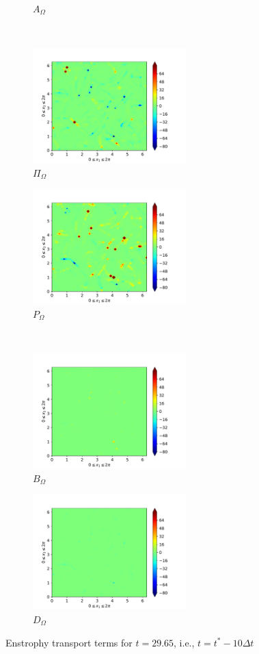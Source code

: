 \begin{figure}[H]
\begin{subfigure}{0.45\textwidth}
        \caption{$A_{\Omega}$}
    \end{subfigure}
    ~
    \begin{subfigure}{0.45\textwidth}
        \includegraphics[height=1.75in]{media/run-cds-65/Pi-enst-1330}
        \caption{$\Pi_{\Omega}$}
    \end{subfigure}
    \newline
    \begin{subfigure}{0.45\textwidth}
        \includegraphics[height=1.75in]{media/run-cds-65/P-enst-1330}
        \caption{$P_{\Omega}$}
    \end{subfigure}
    ~
    \begin{subfigure}{0.45\textwidth}
        \includegraphics[height=1.75in]{media/run-cds-65/B-enst-1330}
        \caption{$B_{\Omega}$}
    \end{subfigure}
    \newline
    \begin{subfigure}{0.45\textwidth}
        \includegraphics[height=1.75in]{media/run-cds-65/D-enst-1330}
        \caption{$D_{\Omega}$}
    \end{subfigure}
    \caption{Enstrophy transport terms for $t=29.65$, i.e., $t=t^{\ast} - 10 \Delta t$}
\end{figure}

